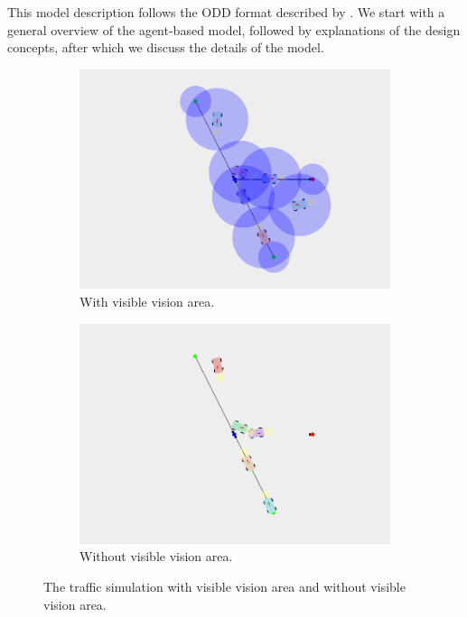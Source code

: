 
This model description follows the ODD format described by \textcite{grimm2006standard}. We start with a general overview of the agent-based model, followed by explanations of the design concepts, after which we discuss the details of the model. 

\begin{figure}
	\centering
	\begin{subfigure}{0.49\textwidth}
		\centering
		\includegraphics[width=\textwidth]{./img/simulationView1}
		\caption{With visible vision area.}
		\label{fig:model:simulation:fix}
	\end{subfigure}
	\begin{subfigure}{0.49\textwidth}
		\centering
		\includegraphics[width=\textwidth]{./img/simulationView2}
		\caption{Without visible vision area.}
		\label{fig:model:simulation:nofix}
	\end{subfigure}	
	\caption{The traffic simulation with  visible vision area and  without visible vision area.}
	\label{fig:model:simulation}
\end{figure}

